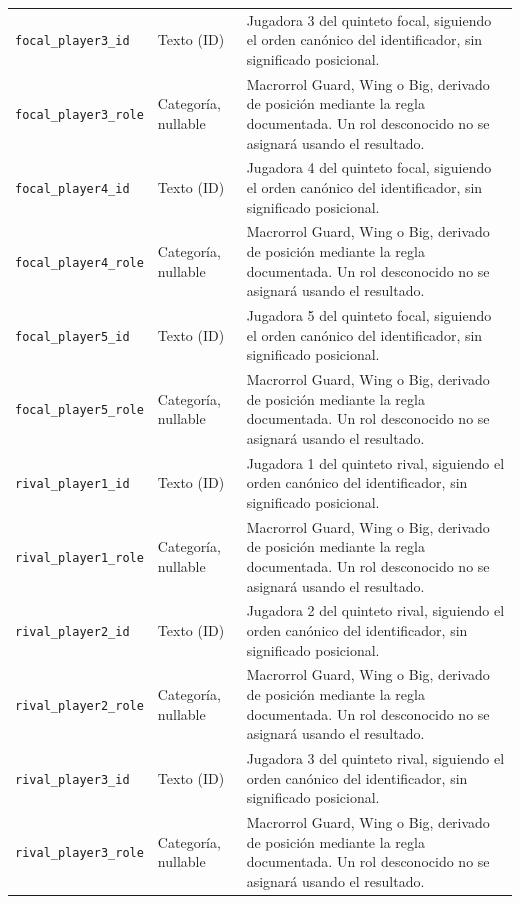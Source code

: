 \begin{longtable}{@{}>{\raggedright\arraybackslash}p{5.0cm}>{\raggedright\arraybackslash}p{1.9cm}>{\raggedright\arraybackslash}p{7.7cm}@{}}
\texttt{focal\_\allowbreak player3\_\allowbreak id} & Texto (ID) & Jugadora 3 del quinteto focal, siguiendo el orden canónico del identificador, sin significado posicional.\\
\texttt{focal\_\allowbreak player3\_\allowbreak role} & Categoría, nullable & Macrorrol Guard, Wing o Big, derivado de posición mediante la regla documentada. Un rol desconocido no se asignará usando el resultado.\\
\texttt{focal\_\allowbreak player4\_\allowbreak id} & Texto (ID) & Jugadora 4 del quinteto focal, siguiendo el orden canónico del identificador, sin significado posicional.\\
\texttt{focal\_\allowbreak player4\_\allowbreak role} & Categoría, nullable & Macrorrol Guard, Wing o Big, derivado de posición mediante la regla documentada. Un rol desconocido no se asignará usando el resultado.\\
\texttt{focal\_\allowbreak player5\_\allowbreak id} & Texto (ID) & Jugadora 5 del quinteto focal, siguiendo el orden canónico del identificador, sin significado posicional.\\
\texttt{focal\_\allowbreak player5\_\allowbreak role} & Categoría, nullable & Macrorrol Guard, Wing o Big, derivado de posición mediante la regla documentada. Un rol desconocido no se asignará usando el resultado.\\
\texttt{rival\_\allowbreak player1\_\allowbreak id} & Texto (ID) & Jugadora 1 del quinteto rival, siguiendo el orden canónico del identificador, sin significado posicional.\\
\texttt{rival\_\allowbreak player1\_\allowbreak role} & Categoría, nullable & Macrorrol Guard, Wing o Big, derivado de posición mediante la regla documentada. Un rol desconocido no se asignará usando el resultado.\\
\texttt{rival\_\allowbreak player2\_\allowbreak id} & Texto (ID) & Jugadora 2 del quinteto rival, siguiendo el orden canónico del identificador, sin significado posicional.\\
\texttt{rival\_\allowbreak player2\_\allowbreak role} & Categoría, nullable & Macrorrol Guard, Wing o Big, derivado de posición mediante la regla documentada. Un rol desconocido no se asignará usando el resultado.\\
\texttt{rival\_\allowbreak player3\_\allowbreak id} & Texto (ID) & Jugadora 3 del quinteto rival, siguiendo el orden canónico del identificador, sin significado posicional.\\
\texttt{rival\_\allowbreak player3\_\allowbreak role} & Categoría, nullable & Macrorrol Guard, Wing o Big, derivado de posición mediante la regla documentada. Un rol desconocido no se asignará usando el resultado.\\

\end{longtable}
